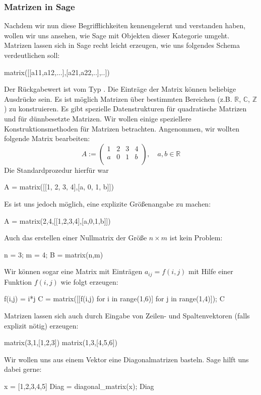 \documentclass[fontsize=12pt,paper=a4,twoside,bibtotoc,idxtotoc,
liststotoc,pagesize,BCOR1.2cm,DIV15,chapterprefix,pagesize=pdftex]{scrbook}
\theoremstyle{plain}
\theoremstyle{definition}
\theoremstyle{remark}
\begin{document}
\subsubsection{Matrizen in Sage}
Nachdem wir nun diese Begrifflichkeiten kennengelernt und verstanden haben, wollen wir uns ansehen, wie Sage mit Objekten dieser Kategorie umgeht.
Matrizen lassen sich in Sage recht leicht erzeugen, wie uns folgendes Schema verdeutlichen soll:
\begin{sagein}
matrix([[a11,a12,...],[a21,a22,..],..])
\end{sagein}
Der Rückgabewert ist vom Typ . Die Einträge der Matrix können beliebige Ausdrücke sein. Es ist möglich Matrizen über bestimmten Bereichen
(z.B. $\mathbb{R}$, $\mathbb{C}$, $\mathbb{Z}$) zu konstruieren. Es gibt spezielle Datenstrukturen für quadratische Matrizen und für dünnbesetzte Matrizen. 
Wir wollen einige speziellere Konstruktionsmethoden für Matrizen betrachten. Angenommen, wir wollten folgende Matrix bearbeiten:
\[ A:= \left( \begin{array}{cccc}
1 & 2 & 3 & 4\\
a & 0 & 1 & b\\ 
\end{array} \right), \quad a,b\in \mathbb{R} \]
Die Standardprozedur hierfür war
\begin{sagein}
A = matrix([[1, 2, 3, 4],[a, 0, 1, b]]) 
\end{sagein}
Es ist uns jedoch möglich, eine explizite Größenangabe zu machen:
\begin{sagein}
A = matrix(2,4,[[1,2,3,4],[a,0,1,b]]) 
\end{sagein}
Auch das erstellen einer Nullmatrix der Größe $n \times m$ ist kein Problem:
\begin{sagein}
n = 3; m = 4; B = matrix(n,m)
\end{sagein}
Wir können sogar eine Matrix mit Einträgen $a_{ij}=f(i,j)$ mit Hilfe einer Funktion $f(i,j)$ wie folgt erzeugen:
\begin{sagein}
f(i,j) = i*j
C = matrix([[f(i,j) for i in range(1,6)] for j in range(1,4)]); C
\end{sagein}
Matrizen lassen sich auch durch Eingabe von Zeilen- und Spaltenvektoren (falls explizit nötig) erzeugen:
\begin{sagein}
matrix(3,1,[1,2,3])
matrix(1,3,[4,5,6])
\end{sagein}
Wir wollen uns aus einem Vektor eine Diagonalmatrizen basteln. Sage hilft uns dabei gerne:
\begin{sagein}
x = [1,2,3,4,5]
Diag = diagonal_matrix(x); Diag
\end{sagein}
\end{document}
